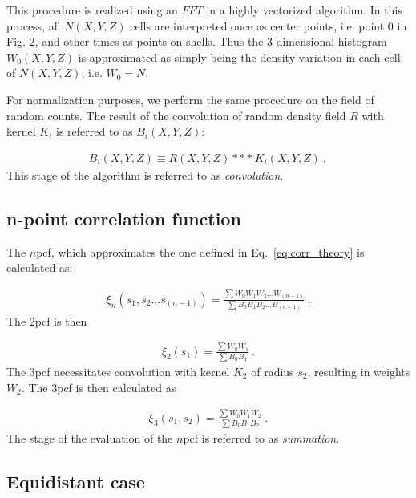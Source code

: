 \documentclass{aa}
\begin{document}
This procedure is realized using an $FFT$ in a highly vectorized algorithm. In this process, all $N(X,Y,Z)$ cells are interpreted once as center points, i.e. point 0 in Fig. 2, and other times as points on shells. Thus the 3-dimensional histogram $W_0(X,Y,Z)$ is approximated as simply being the density variation in each cell of $N(X,Y,Z)$, i.e. $W_0=N$. 

For normalization purposes, we perform the same procedure on the field of random counts. The result of the convolution of random density field $R$ with kernel $K_i$ is referred to as $B_i(X,Y,Z)$:

\begin{align}
B_i(X,Y,Z) \equiv R(X,Y,Z)\ast\ast\ast K_i(X,Y,Z) \ , 
\label{eq:randconv}
\end{align} 
%
This stage of the algorithm is referred to as \textit {convolution}.

\subsection{n-point correlation function}

The $n$pcf, which approximates the one defined in Eq.~\ref{eq:corr_theory} is calculated as:

\begin{align}
\xi_n(s_1,s_2...s_{(n-1)}) =\frac{\sum W_0  W_1 W_2...W_{(n-1)}}{\sum B_0  B_1 B_2...B_{(n-1)} } \ . 
\label{eq:ksin_delta}
\end{align} 
%
The 2pcf is then

\begin{align}
\xi_2(s_1) = \frac{\sum W_0  W_1}{\sum B_0  B_1}  \ . 
\label{eq:ksi2_delta}
\end{align} 
%
The 3pcf necessitates convolution with kernel $K_2$ of radius $s_2$, resulting in weights $W_2$. The 3pcf is then calculated as 

\begin{align}
\xi_3(s_1,s_2) =\frac{\sum W_0  W_1 W_2} {\sum B_0  B_1 B_2}\ . 
\label{eq:ksi3}
\end{align}
The stage of the evaluation of the $n$pcf is referred to as \textit {summation}.

\subsection{Equidistant case}
\end{document}
